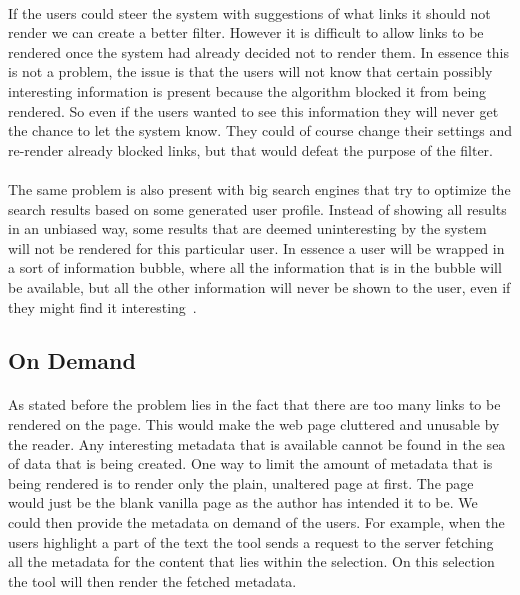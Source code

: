 		\paragraph{}
		If the users could steer the system with suggestions of what links it should not render we can create a better filter. However it is difficult to allow links to be rendered once the system had already decided not to render them. In essence this is not a problem, the issue is that the users will not know that certain possibly interesting information is present because the algorithm blocked it from being rendered. So even if the users wanted to see this information they will never get the chance to let the system know. They could of course change their settings and re-render already blocked links, but that would defeat the purpose of the filter.
		\paragraph{}
		The same problem is also present with big search engines that try to optimize the search results based on some generated user profile. Instead of showing all results in an unbiased way, some results that are deemed uninteresting by the system will not be rendered for this particular user. In essence a user will be wrapped in a sort of information bubble, where all the information that is in the bubble will be available, but all the other information will never be shown to the user, even if they might find it interesting~\cite{pariser2011filter}.
	\subsection{On Demand} \label{ssub:On Demand}
	\paragraph{}
	As stated before the problem lies in the fact that there are too many links to be rendered on the page. This would make the web page cluttered and unusable by the reader. Any interesting metadata that is available cannot be found in the sea of data that is being created. One way to limit the amount of metadata that is being rendered is to render only the plain, unaltered page at first. The page would just be the blank vanilla page as the author has intended it to be. We could then provide the metadata on demand of the users. For example, when the users highlight a part of the text the tool sends a request to the server fetching all the metadata for the content that lies within the selection. On this selection the tool will then render the fetched metadata.
